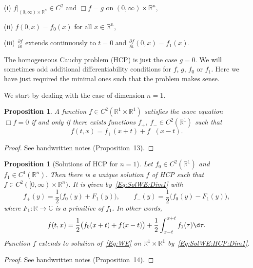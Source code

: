 \documentclass[12pt, oneside, a4paper]{article}
\newtheorem{prop}[thm]{Proposition}
\theoremstyle{dfn}
\def\Rbb{\ensuremath{\mathbb{R}}}
\newcommand{\Com}{\mathbb{C}}
\begin{document}
(i) $f|_{(0,\infty) \times \Rbb^n} \in C^2$ and $\Box f = g$ on $(0,\infty) \times \Rbb^n$,

(ii) $f(0,x) = f_0(x)$ for all $x \in \Rbb^n$,

(iii) $\frac{\partial f}{\partial t}$ extends continuously to $t = 0$ and $\frac{\partial f}{\partial t} (0,x) = f_1(x)$.

\vspace{6pt}

The homogeneous Cauchy problem (HCP) is just the case $g = 0$. We will sometimes add additional differentiability conditions for $f$, $g$, $f_0$ or $f_1$. Here we have just required the minimal ones such that the problem makes sense.

We start by dealing with the case of dimension $n = 1$.

\begin{prop}
A function $f \in C^2(\Rbb^1 \times \Rbb^1)$ satisfies the wave equation $\Box f = 0$ if and only if there exists functions $f_+$, $f_- \in C^2(\Rbb^1)$ such that
\begin{equation}\label{Eq:SolWE:Dim1}
f(t,x) = f_+(x+t) + f_-(x-t).
\end{equation}
\end{prop}

\begin{proof}
See handwritten notes (Proposition~13).
\end{proof}

\begin{prop}[Solutions of HCP for $n = 1$]
Let $f_0 \in C^2(\Rbb^1)$ and $f_1 \in C^1(\Rbb^n)$. Then there is a unique solution $f$ of HCP such that $f \in C^2([0,\infty) \times \Rbb^n)$. It is given by~\eqref{Eq:SolWE:Dim1} with
\[
f_+(y) = \frac{1}{2} \big( f_0(y) + F_1(y) \big),
\qquad f_-(y) = \frac{1}{2} \big( f_0(y) - F_1(y) \big),
\]
where $F_1 \colon \Rbb \to \Com$ is a primitive of $f_1$. In other words,
\begin{equation}\label{Eq:SolWE:HCP:Dim1}
f(t,x)
= \frac{1}{2} \big( f_0(x+t) + f(x-t) \big)
+ \frac{1}{2} \int^{x+t}_{x-t} f_1(\tau) \d\tau.
\end{equation}
Function $f$ extends to solution of~\eqref{Eq:WE} on $\Rbb^1 \times \Rbb^1$ by~\eqref{Eq:SolWE:HCP:Dim1}.
\end{prop}

\begin{proof}
See handwritten notes (Proposition~14).
\end{proof}
\end{document}
